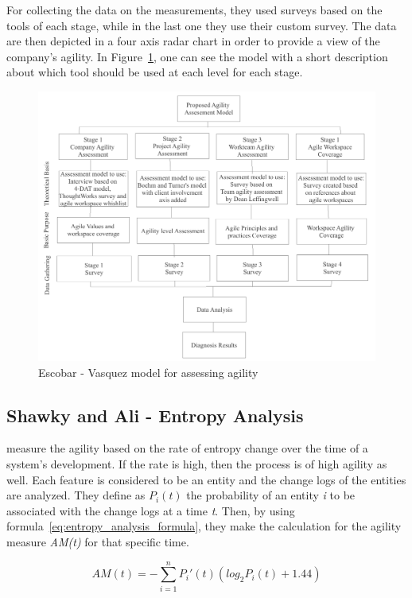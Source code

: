 For collecting the data on the measurements, they used surveys based on the tools of each stage, while in the last one they use their custom survey. The data are then depicted in a four axis radar chart in order to provide a view of the company's agility. In Figure~\ref{escobar_model}, one can see the model with a short description about which tool should be used at each level for each stage.

\begin{figure} [H]
\centerline{\includegraphics[scale=0.75]{include/relatedwork/fig/escobar_model.pdf}}
\caption{Escobar - Vasquez model for assessing agility} 
\label{escobar_model}
\end{figure}

\subsection{Shawky and Ali - Entropy Analysis}
\citet{entropy} measure the agility based on the rate of entropy change over the time of a system's development. If the rate is high, then the process is of high agility as well. Each feature is considered to be an entity and the change logs of the entities are analyzed. They define as $P_i(t)$  the probability of an entity \textit{i} to be associated with the change logs at a time \textit{t}. Then, by using formula~\eqref{eq:entropy_analysis_formula}, they make the calculation for the agility measure \textit{AM(t)} for that specific time.

\begin{equation} \label{eq:entropy_analysis_formula} AM(t) = - \sum_{i=1}^{n} P_i'(t) (log_2 P_i(t) + 1.44) \end{equation} 

